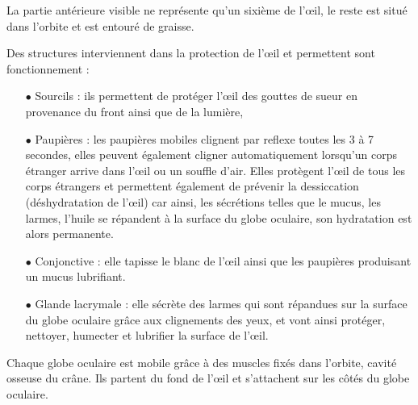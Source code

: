 \documentclass[a4paper, 12pt, onecolumn, openany]{report}
\begin{document}
	La partie antérieure visible ne représente qu’un sixième de l’œil, le reste est situé dans l’orbite et est entouré de graisse. 
	
    Des structures interviennent dans la protection de l’œil et permettent sont fonctionnement :
    \begin{itemize}
   	\item[$\bullet$] Sourcils : ils permettent de protéger l’œil des gouttes de sueur en provenance du front ainsi que de la lumière,
	\item[$\bullet$] Paupières : les paupières mobiles clignent par reflexe toutes les 3 à 7 secondes, elles peuvent également cligner automatiquement lorsqu’un corps étranger arrive dans l’œil ou un souffle d’air.  Elles protègent l’œil de tous les corps étrangers et permettent également de prévenir la dessiccation (déshydratation de l’œil) car ainsi, les sécrétions telles que le mucus, les larmes, l’huile se répandent à la surface du globe oculaire, son hydratation est alors permanente.  
	\item[$\bullet$] Conjonctive : elle tapisse le blanc de l’œil ainsi que les paupières produisant un mucus lubrifiant.
	\item[$\bullet$] Glande lacrymale : elle sécrète des larmes qui sont répandues sur la surface du globe oculaire grâce aux clignements des yeux, et vont ainsi protéger, nettoyer, humecter et lubrifier la surface de l’œil.
	\end{itemize}	
	
	Chaque globe oculaire est mobile grâce à des muscles fixés dans l’orbite, cavité osseuse du crâne. Ils partent du fond de l’œil et s’attachent sur les côtés du globe oculaire. 
	
\end{document}
